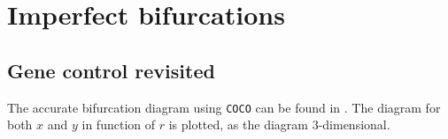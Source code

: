 \documentclass[a4paper,11pt]{article}
\begin{document}
\newpage
\section{Imperfect bifurcations}
\subsection{Gene control revisited}
The accurate bifurcation diagram using \texttt{COCO} can be found in . The diagram for both
$x$ and $y$ in function of $r$ is plotted, as the diagram 3-dimensional.
\begin{figure}[H]
	\centering
\end{figure}
\end{document}
